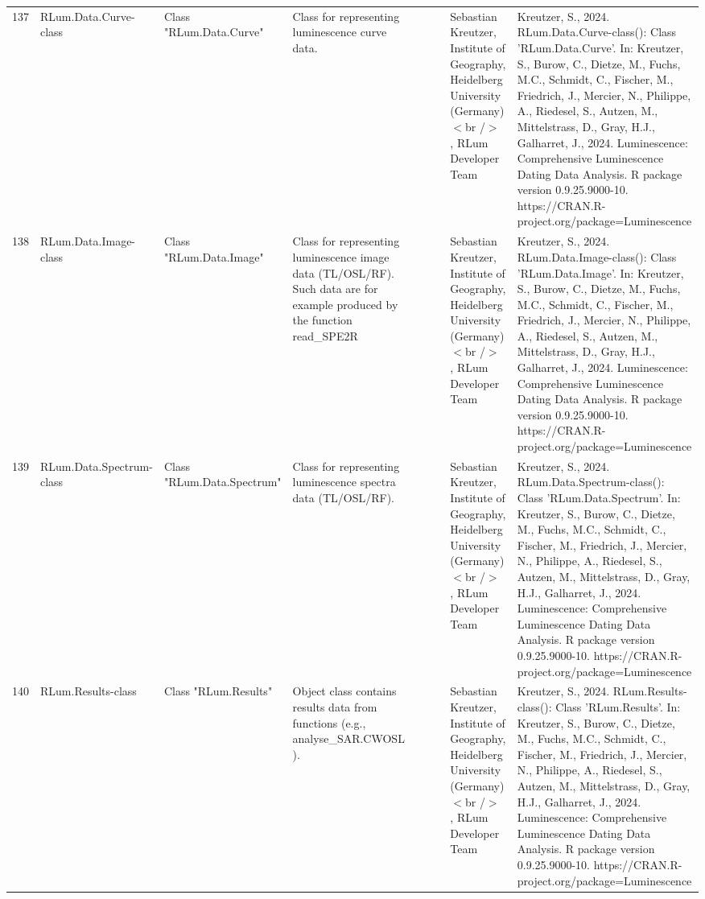\begin{table}[ht]
\begin{tabular}{rllllllll}
  137 & RLum.Data.Curve-class & Class  "RLum.Data.Curve" & Class for representing luminescence curve data. &  &  &  & Sebastian Kreutzer, Institute of Geography, Heidelberg University (Germany)$<$br /$>$ , RLum Developer Team & Kreutzer, S., 2024. RLum.Data.Curve-class(): Class 'RLum.Data.Curve'. In: Kreutzer, S., Burow, C., Dietze, M., Fuchs, M.C., Schmidt, C., Fischer, M., Friedrich, J., Mercier, N., Philippe, A., Riedesel, S., Autzen, M., Mittelstrass, D., Gray, H.J., Galharret, J., 2024. Luminescence: Comprehensive Luminescence Dating Data Analysis. R package version 0.9.25.9000-10. https://CRAN.R-project.org/package=Luminescence
 \\ 
  138 & RLum.Data.Image-class & Class  "RLum.Data.Image" & Class for representing luminescence image data (TL/OSL/RF). Such data are for example produced by the function  read\_SPE2R &  &  &  & Sebastian Kreutzer, Institute of Geography, Heidelberg University (Germany)$<$br /$>$ , RLum Developer Team & Kreutzer, S., 2024. RLum.Data.Image-class(): Class 'RLum.Data.Image'. In: Kreutzer, S., Burow, C., Dietze, M., Fuchs, M.C., Schmidt, C., Fischer, M., Friedrich, J., Mercier, N., Philippe, A., Riedesel, S., Autzen, M., Mittelstrass, D., Gray, H.J., Galharret, J., 2024. Luminescence: Comprehensive Luminescence Dating Data Analysis. R package version 0.9.25.9000-10. https://CRAN.R-project.org/package=Luminescence
 \\ 
  139 & RLum.Data.Spectrum-class & Class  "RLum.Data.Spectrum" & Class for representing luminescence spectra data (TL/OSL/RF). &  &  &  & Sebastian Kreutzer, Institute of Geography, Heidelberg University (Germany)$<$br /$>$ , RLum Developer Team & Kreutzer, S., 2024. RLum.Data.Spectrum-class(): Class 'RLum.Data.Spectrum'. In: Kreutzer, S., Burow, C., Dietze, M., Fuchs, M.C., Schmidt, C., Fischer, M., Friedrich, J., Mercier, N., Philippe, A., Riedesel, S., Autzen, M., Mittelstrass, D., Gray, H.J., Galharret, J., 2024. Luminescence: Comprehensive Luminescence Dating Data Analysis. R package version 0.9.25.9000-10. https://CRAN.R-project.org/package=Luminescence
 \\ 
  140 & RLum.Results-class & Class  "RLum.Results" & Object class contains results data from functions (e.g.,  analyse\_SAR.CWOSL ). &  &  &  & Sebastian Kreutzer, Institute of Geography, Heidelberg University (Germany)$<$br /$>$ , RLum Developer Team & Kreutzer, S., 2024. RLum.Results-class(): Class 'RLum.Results'. In: Kreutzer, S., Burow, C., Dietze, M., Fuchs, M.C., Schmidt, C., Fischer, M., Friedrich, J., Mercier, N., Philippe, A., Riedesel, S., Autzen, M., Mittelstrass, D., Gray, H.J., Galharret, J., 2024. Luminescence: Comprehensive Luminescence Dating Data Analysis. R package version 0.9.25.9000-10. https://CRAN.R-project.org/package=Luminescence

\end{tabular}
\end{table}
